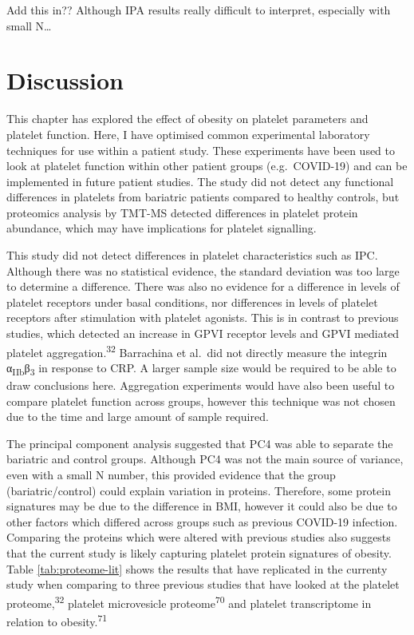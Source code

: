\documentclass[11pt,twoside]{bristolthesis}
\begin{document}
Add this in?? Although IPA results really difficult to interpret, especially with small N\ldots{}

\hypertarget{discussion-1}{%
\section{Discussion}\label{discussion-1}}

This chapter has explored the effect of obesity on platelet parameters and platelet function. Here, I have optimised common experimental laboratory techniques for use within a patient study. These experiments have been used to look at platelet function within other patient groups (e.g.~COVID-19) and can be implemented in future patient studies. The study did not detect any functional differences in platelets from bariatric patients compared to healthy controls, but proteomics analysis by TMT-MS detected differences in platelet protein abundance, which may have implications for platelet signalling.

This study did not detect differences in platelet characteristics such as IPC. Although there was no statistical evidence, the standard deviation was too large to determine a difference. There was also no evidence for a difference in levels of platelet receptors under basal conditions, nor differences in levels of platelet receptors after stimulation with platelet agonists. This is in contrast to previous studies, which detected an increase in GPVI receptor levels and GPVI mediated platelet aggregation.\textsuperscript{32} Barrachina et al.~did not directly measure the integrin α\textsubscript{IIb}β\textsubscript{3} in response to CRP. A larger sample size would be required to be able to draw conclusions here. Aggregation experiments would have also been useful to compare platelet function across groups, however this technique was not chosen due to the time and large amount of sample required.

The principal component analysis suggested that PC4 was able to separate the bariatric and control groups. Although PC4 was not the main source of variance, even with a small N number, this provided evidence that the group (bariatric/control) could explain variation in proteins. Therefore, some protein signatures may be due to the difference in BMI, however it could also be due to other factors which differed across groups such as previous COVID-19 infection. Comparing the proteins which were altered with previous studies also suggests that the current study is likely capturing platelet protein signatures of obesity. Table \ref{tab:proteome-lit} shows the results that have replicated in the currenty study when comparing to three previous studies that have looked at the platelet proteome,\textsuperscript{32} platelet microvesicle proteome\textsuperscript{70} and platelet transcriptome in relation to obesity.\textsuperscript{71}
\end{document}
